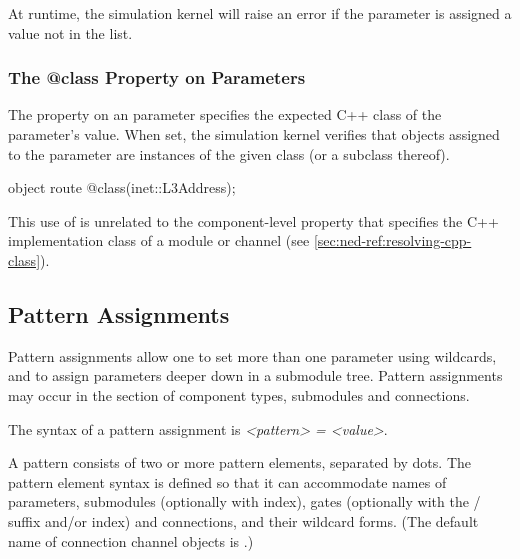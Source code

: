 At runtime, the simulation kernel will raise an error if the parameter is
assigned a value not in the list.


\subsubsection{The @class Property on Parameters}
\label{sec:ned-ref:class-param-property}

The  property on an  parameter specifies the
expected C++ class of the parameter's value. When set, the simulation kernel
verifies that objects assigned to the parameter are instances of the given
class (or a subclass thereof).

\begin{ned}
object route @class(inet::L3Address);
\end{ned}

\begin{note}
    This use of  is unrelated to the component-level 
    property that specifies the C++ implementation class of a module or channel
    (see \ref{sec:ned-ref:resolving-cpp-class}).
\end{note}


\subsection{Pattern Assignments}
\label{sec:ned-ref:pattern-assignments}

Pattern assignments allow one to set more than one parameter using
wildcards, and to assign parameters deeper down in a submodule tree.
Pattern assignments may occur in the 
section of component types, submodules and connections.

The syntax of a pattern assignment is \textit{<pattern> = <value>}.

A pattern consists of two or more pattern elements, separated by dots.
The pattern element syntax is defined so that it can accommodate names of
parameters, submodules (optionally with index), gates (optionally with the
/ suffix and/or index) and connections, and their
wildcard forms. (The default name of connection channel objects is
.)

